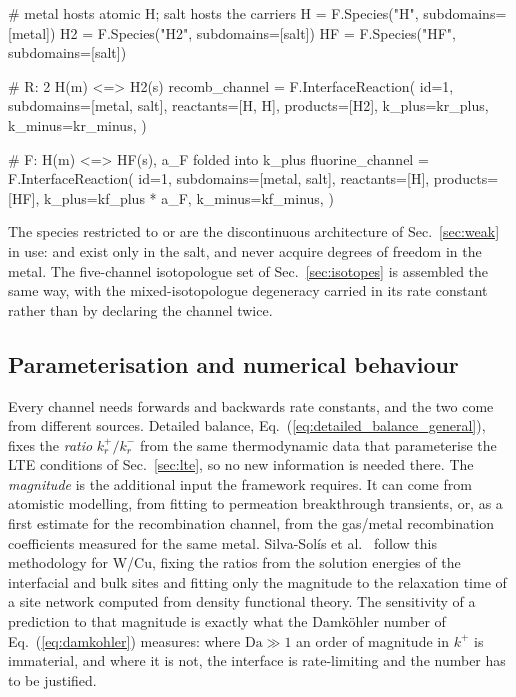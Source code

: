 \documentclass[5p]{elsarticle}
\newcommand{\Da}{\mathrm{Da}}
\begin{document}
\begin{python}
# metal hosts atomic H; salt hosts the carriers
H  = F.Species("H",  subdomains=[metal])
H2 = F.Species("H2", subdomains=[salt])
HF = F.Species("HF", subdomains=[salt])

# R: 2 H(m) <=> H2(s)
recomb_channel = F.InterfaceReaction(
    id=1,
    subdomains=[metal, salt],
    reactants=[H, H],
    products=[H2],
    k_plus=kr_plus,
    k_minus=kr_minus,
)

# F: H(m) <=> HF(s), a_F folded into k_plus
fluorine_channel = F.InterfaceReaction(
    id=1,
    subdomains=[metal, salt],
    reactants=[H],
    products=[HF],
    k_plus=kf_plus * a_F,
    k_minus=kf_minus,
)

\end{python}

The species restricted to \pyth{[metal]} or \pyth{[salt]} are the discontinuous architecture of Sec.~\ref{sec:weak} in use:  and  exist only in the salt, and never acquire degrees of freedom in the metal.
The five-channel isotopologue set of Sec.~\ref{sec:isotopes} is assembled the same way, with the mixed-isotopologue degeneracy carried in its rate constant rather than by declaring the channel twice.

\subsection{Parameterisation and numerical behaviour}
\label{sec:params}

Every channel needs forwards and backwards rate constants, and the two come from different sources.
Detailed balance, Eq.~(\ref{eq:detailed_balance_general}), fixes the \emph{ratio} $k_r^{+}/k_r^{-}$ from the same thermodynamic data that parameterise the LTE conditions of Sec.~\ref{sec:lte}, so no new information is needed there.
The \emph{magnitude} is the additional input the framework requires.
It can come from atomistic modelling, from fitting to permeation breakthrough transients, or, as a first estimate for the recombination channel, from the gas/metal recombination coefficients measured for the same metal.
Silva-Sol\'is et al.\ \cite{silva-solis_hydrogen_2026} follow this methodology for W/Cu, fixing the ratios from the solution energies of the interfacial and bulk sites \cite{silva-solis_solution_2024} and fitting only the magnitude to the relaxation time of a site network computed from density functional theory. 
The sensitivity of a prediction to that magnitude is exactly what the Damk\"ohler number of Eq.~(\ref{eq:damkohler}) measures: where $\Da \gg 1$ an order of magnitude in $k^{+}$ is immaterial, and where it is not, the interface is rate-limiting and the number has to be justified.
\end{document}
